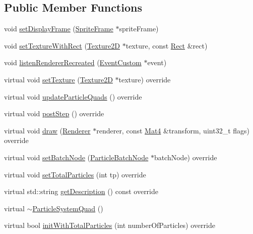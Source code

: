 \subsection*{Public Member Functions}
\begin{DoxyCompactItemize}
\item 
void \hyperlink{classParticleSystemQuad_a8a9c1216cee41ca83f508da8a65529d1}{set\+Display\+Frame} (\hyperlink{classSpriteFrame}{Sprite\+Frame} $\ast$sprite\+Frame)
\item 
void \hyperlink{classParticleSystemQuad_a496325dbe905d3359382c149b04d8f9b}{set\+Texture\+With\+Rect} (\hyperlink{classTexture2D}{Texture2D} $\ast$texture, const \hyperlink{classRect}{Rect} \&rect)
\item 
void \hyperlink{classParticleSystemQuad_aa133fa205fb39f435a9b46545612fd42}{listen\+Renderer\+Recreated} (\hyperlink{classEventCustom}{Event\+Custom} $\ast$event)
\item 
virtual void \hyperlink{classParticleSystemQuad_aca7c2f7c82f41ef6d619506e8a9fe152}{set\+Texture} (\hyperlink{classTexture2D}{Texture2D} $\ast$texture) override
\item 
virtual void \hyperlink{classParticleSystemQuad_a4f73ff1d0afde788ba41f0bcbe8dd9d5}{update\+Particle\+Quads} () override
\item 
virtual void \hyperlink{classParticleSystemQuad_a01acd79f49bb71657e40e856d9d7456b}{post\+Step} () override
\item 
virtual void \hyperlink{classParticleSystemQuad_a4bfacab6a326829bcc97be90ea9c6a01}{draw} (\hyperlink{classRenderer}{Renderer} $\ast$renderer, const \hyperlink{classMat4}{Mat4} \&transform, uint32\+\_\+t flags) override
\item 
virtual void \hyperlink{classParticleSystemQuad_a0609c28ee1074bae27e971af5693a37d}{set\+Batch\+Node} (\hyperlink{classParticleBatchNode}{Particle\+Batch\+Node} $\ast$batch\+Node) override
\item 
virtual void \hyperlink{classParticleSystemQuad_a11be26d03c7ddefb91f16a93fb849439}{set\+Total\+Particles} (int tp) override
\item 
virtual std\+::string \hyperlink{classParticleSystemQuad_a33c853c9e7bd5763c7775b1944ec9572}{get\+Description} () const override
\item 
virtual \hyperlink{classParticleSystemQuad_a9d6e31482e65eaadd3f2536b895daada}{$\sim$\+Particle\+System\+Quad} ()
\item 
virtual bool \hyperlink{classParticleSystemQuad_ae5420007b57e909c05e7476a54fbfbe9}{init\+With\+Total\+Particles} (int number\+Of\+Particles) override

\end{DoxyCompactItemize}
